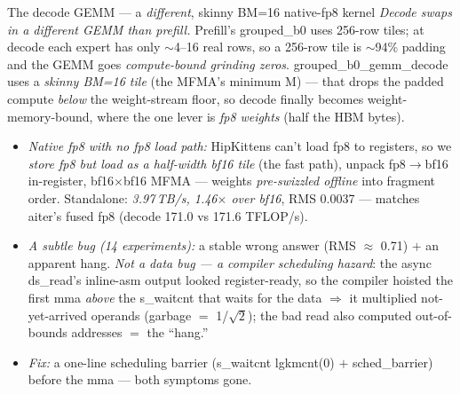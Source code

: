 \documentclass[pdf,aspectratio=169]{beamer}
\newcommand{\empy}[1]{{\color{darkorange}\emph{#1}}}
\newcommand{\empr}[1]{{\color{cardinalred}\emph{#1}}}
\newcommand{\mc}[1]{{\ttfamily\small #1}}
\begin{document}
\begin{frame}{The decode GEMM --- a \emph{different}, skinny BM=16 native-fp8 kernel}
\footnotesize
\empr{Decode swaps in a different GEMM than prefill.} Prefill's \mc{grouped\_b0} uses 256-row tiles; at decode each expert has only $\sim$4--16 real rows, so a 256-row tile is $\sim$94\% padding and the GEMM goes \emph{compute-bound grinding zeros}. \mc{grouped\_b0\_gemm\_decode} uses a \empy{skinny BM=16 tile} (the MFMA's minimum M) --- that drops the padded compute \emph{below} the weight-stream floor, so decode finally becomes weight-memory-bound, where the one lever is \empy{fp8 weights} (half the HBM bytes).
\begin{itemize}\footnotesize
  \item \empr{Native fp8 with no fp8 load path:} HipKittens can't load fp8 to registers, so we \empy{store fp8 but \emph{load as} a half-width bf16 tile} (the fast path), unpack fp8$\to$bf16 in-register, bf16$\times$bf16 MFMA --- weights \emph{pre-swizzled offline} into fragment order. Standalone: \empy{3.97\,TB/s, 1.46$\times$ over bf16}, RMS 0.0037 --- matches aiter's fused fp8 (decode 171.0 vs 171.6 TFLOP/s).
  \item \empr{A subtle bug (14 experiments):} a stable wrong answer (RMS $\approx$ 0.71) $+$ an apparent hang. \empy{Not a data bug --- a compiler scheduling hazard}: the async \mc{ds\_read}'s inline-asm output looked register-ready, so the compiler hoisted the first \mc{mma} \emph{above} the \mc{s\_waitcnt} that waits for the data $\Rightarrow$ it multiplied not-yet-arrived operands (garbage $=$ 1/$\sqrt2$); the bad read also computed out-of-bounds addresses $=$ the ``hang.''
  \item \empr{Fix:} a one-line scheduling barrier (\mc{s\_waitcnt lgkmcnt(0)} $+$ \mc{sched\_barrier}) before the mma --- both symptoms gone.
\end{itemize}
\end{frame}
\end{document}
